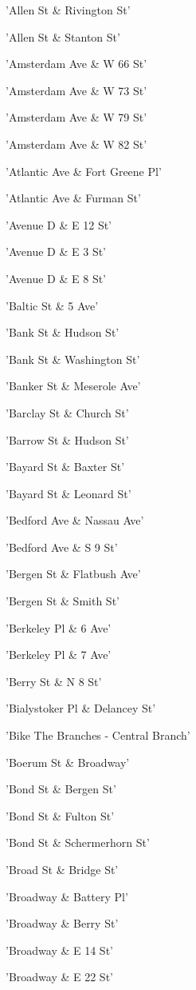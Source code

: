 \documentclass[11pt]{article}
\begin{document}
\begin{enumerate*}
\item 'Allen St \& Rivington St'
\item 'Allen St \& Stanton St'
\item 'Amsterdam Ave \& W 66 St'
\item 'Amsterdam Ave \& W 73 St'
\item 'Amsterdam Ave \& W 79 St'
\item 'Amsterdam Ave \& W 82 St'
\item 'Atlantic Ave \& Fort Greene Pl'
\item 'Atlantic Ave \& Furman St'
\item 'Avenue D \& E 12 St'
\item 'Avenue D \& E 3 St'
\item 'Avenue D \& E 8 St'
\item 'Baltic St \& 5 Ave'
\item 'Bank St \& Hudson St'
\item 'Bank St \& Washington St'
\item 'Banker St \& Meserole Ave'
\item 'Barclay St \& Church St'
\item 'Barrow St \& Hudson St'
\item 'Bayard St \& Baxter St'
\item 'Bayard St \& Leonard St'
\item 'Bedford Ave \& Nassau Ave'
\item 'Bedford Ave \& S 9 St'
\item 'Bergen St \& Flatbush Ave'
\item 'Bergen St \& Smith St'
\item 'Berkeley Pl \& 6 Ave'
\item 'Berkeley Pl \& 7 Ave'
\item 'Berry St \& N 8 St'
\item 'Bialystoker Pl \& Delancey St'
\item 'Bike The Branches - Central Branch'
\item 'Boerum St \& Broadway'
\item 'Bond St \& Bergen St'
\item 'Bond St \& Fulton St'
\item 'Bond St \& Schermerhorn St'
\item 'Broad St \& Bridge St'
\item 'Broadway \& Battery Pl'
\item 'Broadway \& Berry St'
\item 'Broadway \& E 14 St'
\item 'Broadway \& E 22 St'

\end{enumerate*}
\end{document}
